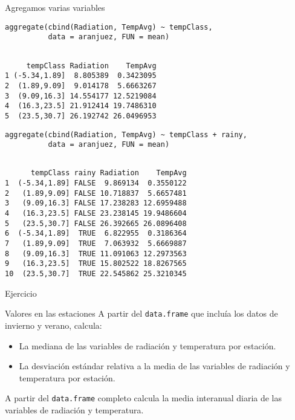 \documentclass[aspectratio=169, usenames,svgnames,dvipsnames]{beamer}
\begin{document}
\begin{frame}[label={sec:orgb388a58},fragile]{Agregamos varias variables}
 \lstset{language=r,label= ,caption= ,captionpos=b,numbers=none}
\begin{lstlisting}
aggregate(cbind(Radiation, TempAvg) ~ tempClass,
          data = aranjuez, FUN = mean)
\end{lstlisting}

\begin{verbatim}

     tempClass Radiation    TempAvg
1 (-5.34,1.89]  8.805389  0.3423095
2  (1.89,9.09]  9.014178  5.6663267
3  (9.09,16.3] 14.554177 12.5219084
4  (16.3,23.5] 21.912414 19.7486310
5  (23.5,30.7] 26.192742 26.0496953
\end{verbatim}


\lstset{language=r,label= ,caption= ,captionpos=b,numbers=none}
\begin{lstlisting}
aggregate(cbind(Radiation, TempAvg) ~ tempClass + rainy,
          data = aranjuez, FUN = mean)
\end{lstlisting}

\begin{verbatim}

      tempClass rainy Radiation    TempAvg
1  (-5.34,1.89] FALSE  9.869134  0.3550122
2   (1.89,9.09] FALSE 10.718837  5.6657481
3   (9.09,16.3] FALSE 17.238283 12.6959488
4   (16.3,23.5] FALSE 23.238145 19.9486604
5   (23.5,30.7] FALSE 26.392665 26.0896408
6  (-5.34,1.89]  TRUE  6.822955  0.3186364
7   (1.89,9.09]  TRUE  7.063932  5.6669887
8   (9.09,16.3]  TRUE 11.091063 12.2973563
9   (16.3,23.5]  TRUE 15.802522 18.8267565
10  (23.5,30.7]  TRUE 22.545862 25.3210345
\end{verbatim}
\end{frame}


\begin{frame}[label={sec:orga07a239},fragile]{Ejercicio}
 \begin{block}{Valores en las estaciones}
A partir del \texttt{data.frame} que incluía los datos de invierno y verano, calcula:

\begin{itemize}
\item La \alert{mediana} de las variables de radiación y temperatura por estación.
\item La \alert{desviación estándar} relativa a la media de las variables de radiación y temperatura por estación.
\end{itemize}

A partir del \texttt{data.frame} completo calcula la \alert{media} interanual diaria de las variables de radiación y temperatura.
\end{block}
\end{frame}
\end{document}

